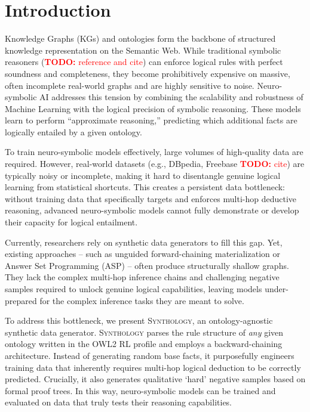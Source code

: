 \documentclass{IOS-Book-Article}     %
\newcommand{\todo}[1]{\textcolor{red}{\textbf{TODO:} #1}}
\begin{document}
\section{Introduction}

Knowledge Graphs (KGs) and ontologies form the backbone of structured knowledge representation on the Semantic Web. While traditional symbolic reasoners (\todo{reference and cite}) can enforce logical rules with perfect soundness and completeness, they become prohibitively expensive on massive, often incomplete real-world graphs and are highly sensitive to noise. Neuro-symbolic AI addresses this tension by combining the scalability and robustness of Machine Learning with the logical precision of symbolic reasoning. These models learn to perform ``approximate reasoning,'' predicting which additional facts are logically entailed by a given ontology.

To train neuro-symbolic models effectively, large volumes of high-quality data are required. However, real-world datasets (e.g., DBpedia, Freebase \todo{cite}) are typically noisy or incomplete, making it hard to disentangle genuine logical learning from statistical shortcuts. This creates a persistent data bottleneck: without training data that specifically targets and enforces multi-hop deductive reasoning, advanced neuro-symbolic models cannot fully demonstrate or develop their capacity for logical entailment.

Currently, researchers rely on synthetic data generators to fill this gap. Yet, existing approaches -- such as unguided forward-chaining materialization or Answer Set Programming (ASP) -- often produce structurally shallow graphs. They lack the complex multi-hop inference chains and challenging negative samples required to unlock genuine logical capabilities, leaving models under-prepared for the complex inference tasks they are meant to solve.

To address this bottleneck, we present \textsc{Synthology}, an ontology-agnostic synthetic data generator. \textsc{Synthology} parses the rule structure of \textit{any} given ontology written in the OWL2 RL profile and employs a backward-chaining architecture. Instead of generating random base facts, it purposefully engineers training data that inherently requires multi-hop logical deduction to be correctly predicted. Crucially, it also generates qualitative `hard' negative samples based on formal proof trees. In this way, neuro-symbolic models can be trained and evaluated on data that truly tests their reasoning capabilities.
\end{document}

